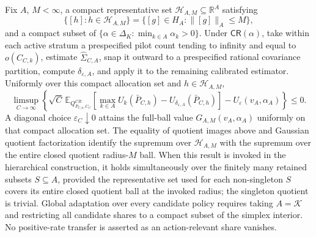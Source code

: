 Fix \(A\), \(M<\infty\), a compact representative set \(\mathscr H_{A,M}\subseteq\mathbb R^A\) satisfying
\[
\{[h]:h\in\mathscr H_{A,M}\}
=\{[g]\in H_A:\lVert[g]\rVert_A\leq M\},
\]
and a compact subset of \(\{\alpha\in\Delta_K:\min_{k\in A}\alpha_k>0\}\).  Under \(\mathsf{CR}(\alpha)\), take within each active stratum a prespecified pilot count tending to infinity and equal to \(o(C_{C,k})\), estimate \(\widehat\Sigma_{C,A}\), snap it outward to a prespecified rational covariance partition, compute \(\delta_{\varepsilon,A}\), and apply it to the remaining calibrated estimator.  Uniformly over this compact allocation set and \(h\in\mathscr H_{A,M}\),
\[
\limsup_{C\to\infty}\left\{\sqrt C\,\mathbb E_{Q^{CR}_{\bar P_{C,h},C_C}}
\left[\max_{k\in A}U_k(\bar P_{C,h})-U_{\delta_{\varepsilon,A}}(\bar P_{C,h})\right]
-U_\varepsilon(v_A,\alpha_A)\right\}\leq0.
\]
A diagonal choice \(\varepsilon_C\downarrow0\) attains the full-ball value \(G_{A,M}(v_A,\alpha_A)\) uniformly on that compact allocation set.  The equality of quotient images above and Gaussian quotient factorization identify the supremum over \(\mathscr H_{A,M}\) with the supremum over the entire closed quotient radius-\(M\) ball.  When this result is invoked in the hierarchical construction, it holds simultaneously over the finitely many retained subsets \(S\subseteq A\), provided the representative set used for each non-singleton \(S\) covers its entire closed quotient ball at the invoked radius; the singleton quotient is trivial.  Global adaptation over every candidate policy requires taking \(A=\mathcal K\) and restricting all candidate shares to a compact subset of the simplex interior.  No positive-rate transfer is asserted as an action-relevant share vanishes.
